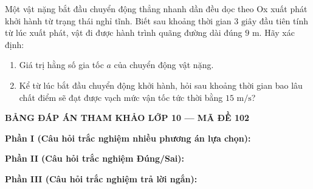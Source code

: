 \begin{ex}%
	Một vật nặng bắt đầu chuyển động thẳng nhanh dần đều dọc theo Ox xuất phát khởi hành từ trạng thái nghỉ tĩnh. Biết sau khoảng thời gian $3\text{ giây}$ đầu tiên tính từ lúc xuất phát, vật đi được hành trình quãng đường dài đúng $9\text{ m}$. Hãy xác định:
	\begin{enumerate}
		\item[a.] Giá trị hằng số gia tốc $a$ của chuyển động vật nặng.
		\item[b.] Kể từ lúc bắt đầu chuyển động khởi hành, hỏi sau khoảng thời gian bao lâu chất điểm sẽ đạt được vạch mức vận tốc tức thời bằng $15\text{ m/s}$?
	\end{enumerate}
\end{ex}


\newpage
\begin{center} \textbf{BẢNG ĐÁP ÁN THAM KHẢO LỚP 10 --- MÃ ĐỀ 102} \end{center}

\noindent \textbf{Phần I (Câu hỏi trắc nghiệm nhiều phương án lựa chọn):}  

\noindent \textbf{Phần II (Câu hỏi trắc nghiệm Đúng/Sai):}

\noindent \textbf{Phần III (Câu hỏi trắc nghiệm trả lời ngắn):}

\label{B\thedeso}
